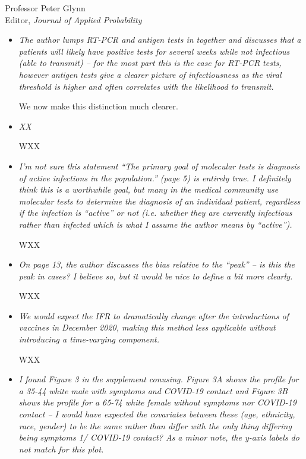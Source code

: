 \documentclass[11pt]{letter} %
\begin{document}
\begin{letter}{Professor
	Peter Glynn\\
	Editor, {\em Journal of Applied Probability}}
\begin{itemize}
We thank the reviewer and now match this more careful language to be more exact in our description.
\vspace{5mm}
\item {\it The author lumps RT-PCR and antigen tests in together and discusses that a patients will likely have positive tests for several weeks while not infectious (able to transmit) – for the most part this is the case for RT-PCR tests, however antigen tests give a clearer picture of infectiousness as the viral threshold is higher and often correlates with the likelihood to transmit.}

\vspace{5mm}
We now make this distinction much clearer.
\vspace{5mm}
\item {\it XX}

\vspace{5mm}
WXX
\vspace{5mm}
\item {\it I’m not sure this statement “The primary goal of molecular tests is diagnosis of active infections in the population.” (page 5) is entirely true. I definitely think this is a worthwhile goal, but many in the medical community use molecular tests to determine the diagnosis of an individual patient, regardless if the infection is “active” or not (i.e. whether they are currently infectious rather than infected which is what I assume the author means by “active”).}

\vspace{5mm}
WXX
\vspace{5mm}
\item {\it On page 13, the author discusses the bias relative to the “peak” – is this the peak in cases? I believe so, but it would be nice to define a bit more clearly.}

\vspace{5mm}
WXX
\vspace{5mm}
\item {\it We would expect the IFR to dramatically change after the introductions of vaccines in December 2020, making this method less applicable without introducing a time-varying component.}

\vspace{5mm}
WXX
\vspace{5mm}
\item {\it I found Figure 3 in the supplement conusing. Figure 3A shows the profile for a 35-44 white male with symptoms and COVID-19 contact and Figure 3B shows the profile for a 65-74 white female without symptoms nor COVID-19 contact – I would have expected the covariates between these (age, ethnicity, race, gender) to be the same rather than differ with the only thing differing being symptoms 1/ COVID-19 contact? As a minor note, the y-axis labels do not match for this plot.}


\end{itemize}
\end{letter}
\end{document}
